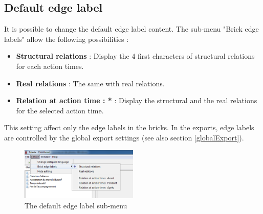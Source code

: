 \subsection{Default edge label}
It is possible to change the default edge label content. The sub-menu "Brick edge labels" allow the following possibilities : 
\begin{itemize}
\item \textbf{Structural relations} : Display the 4 first characters of structural relations for each action times.\\
\item \textbf{Real relations} : The same with real relations.\\
\item \textbf{Relation at action time : *} : Display the structural and the real relations for the selected action time.\\
\end{itemize}

This setting affect only the edge labels in the bricks. In the exports, edge labels are controlled by the global export settings (see also section \ref{globalExport}).\\

\begin{figure}[h!]
\centering
\includegraphics[width=0.5\textwidth]{../images/menu_edition.png}
\caption{The default edge label sub-menu}
\label{menu_edition}
\end{figure}

